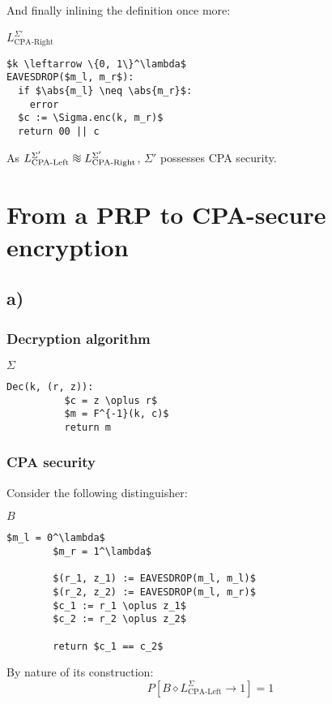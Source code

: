 \documentclass[a4paper]{scrreprt}
\DeclarePairedDelimiter\abs{\lvert}{\rvert}
\newcommand*{\diffeo}{%
  \mathrel{\vcenter{\offinterlineskip
  \hbox{$\sim$}\vskip-.35ex\hbox{$\sim$}\vskip-.35ex\hbox{$\sim$}}}}
\begin{document}
And finally inlining the definition once more:
\begin{library}{$L^{\Sigma'}_{\text{CPA-Right}}$}
	\begin{lstlisting}[mathescape=true]
$k \leftarrow \{0, 1\}^\lambda$
EAVESDROP($m_l, m_r$):
  if $\abs{m_l} \neq \abs{m_r}$:
    error
  $c := \Sigma.enc(k, m_r)$
  return 00 || c
	\end{lstlisting}
\end{library}

As $L^{\Sigma'}_{\text{CPA-Left}} \diffeo L^{\Sigma'}_{\text{CPA-Right}}$,
$\Sigma'$ possesses CPA security.

\section{From a PRP to CPA-secure encryption}

\subsection{a)}

\subsubsection{Decryption algorithm}

\begin{library}{$\Sigma$}
	\begin{lstlisting}[mathescape=true,autogobble=true]
		Dec(k, (r, z)):
		  $c = z \oplus r$
		  $m = F^{-1}(k, c)$
		  return m
	\end{lstlisting}
\end{library}

\subsubsection{CPA security}

Consider the following distinguisher:
\begin{library}{$B$}
	\begin{lstlisting}[mathescape=true,autogobble=true]
		$m_l = 0^\lambda$
		$m_r = 1^\lambda$

		$(r_1, z_1) := EAVESDROP(m_l, m_l)$
		$(r_2, z_2) := EAVESDROP(m_l, m_r)$
		$c_1 := r_1 \oplus z_1$
		$c_2 := r_2 \oplus z_2$

		return $c_1 == c_2$
	\end{lstlisting}
\end{library}

By nature of its construction:
\[
	P[B \diamond L^{\Sigma}_{\text{CPA-Left}} \rightarrow 1] = 1
\]
\end{document}
